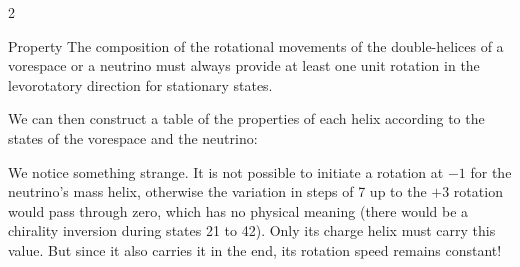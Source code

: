\begin{multicols}{2}
	\begin{mybox}[breakable,colback=blue!10, colbacktitle=pkcolor]{Property}
		The composition of the rotational movements of the double-helices of a vorespace or a neutrino must always provide at least one unit rotation in the levorotatory direction for stationary states.
	\end{mybox}
	\medskip
	
	We can then construct a table of the properties of each helix according to the states of the vorespace and the neutrino:
	\vspace*{-0.5cm}
	\begin{center}
	\end{center}
	
	We notice something strange. It is not possible to initiate a rotation at $-1$ for the neutrino's mass helix, otherwise the variation in steps of 7 up to the $+3$ rotation would pass through zero, which has no physical meaning (there would be a chirality inversion during states 21 to 42). Only its charge helix must carry this value. But since it also carries it in the end, its rotation speed remains constant!
	

\end{multicols}
